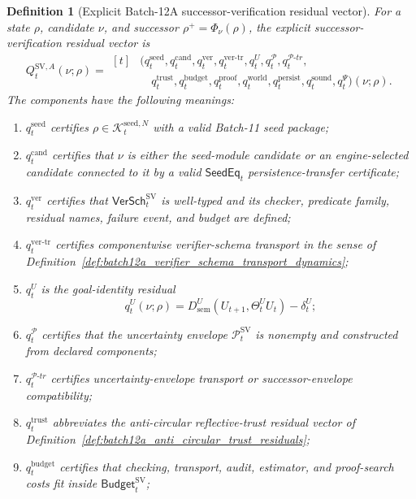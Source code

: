 \documentclass[11pt]{article}
\newtheorem{definition}[theorem]{Definition}
\newcommand{\Pcal}{\mathcal{P}}
\newcommand{\1}{\mathbf{1}}
\providecommand{\Kcal}{\mathcal{K}}
\providecommand{\sem}{\mathrm{sem}}
\begin{document}
\begin{definition}[Explicit Batch-12A successor-verification residual vector]
\label{def:batch12a_explicit_sv_residual_vector}
For a state \(\rho\), candidate \(\nu\), and successor \(\rho^+=\Phi_\nu(\rho)\), the explicit successor-verification residual vector is
\[
Q_t^{\mathrm{SV},A}(\nu;\rho)
=
\begin{aligned}[t]
{}&\bigl(q_t^{\mathrm{seed}},q_t^{\mathrm{cand}},q_t^{\mathrm{ver}},q_t^{\mathrm{ver\mbox{-}tr}},q_t^{U},q_t^{\Pcal},q_t^{\Pcal\mbox{-}tr},\\
&\quad q_t^{\mathrm{trust}},q_t^{\mathrm{budget}},q_t^{\mathrm{proof}},q_t^{\mathrm{world}},q_t^{\mathrm{persist}},q_t^{\mathrm{sound}},q_t^{\Psi}\bigr)(\nu;\rho).
\end{aligned}
\]
The components have the following meanings:
\begin{enumerate}[label=(\roman*),leftmargin=1.5em]
    \item \(q_t^{\mathrm{seed}}\) certifies \(\rho\in\Kcal_t^{\mathrm{seed},N}\) with a valid Batch-11 seed package;
    \item \(q_t^{\mathrm{cand}}\) certifies that \(\nu\) is either the seed-module candidate or an engine-selected candidate connected to it by a valid \(\mathsf{SeedEq}_t\) persistence-transfer certificate;
    \item \(q_t^{\mathrm{ver}}\) certifies that \(\mathsf{VerSch}_t^{\mathrm{SV}}\) is well-typed and its checker, predicate family, residual names, failure event, and budget are defined;
    \item \(q_t^{\mathrm{ver\mbox{-}tr}}\) certifies componentwise verifier-schema transport in the sense of Definition~\ref{def:batch12a_verifier_schema_transport_dynamics};
    \item \(q_t^U\) is the goal-identity residual
    \[
    q_t^U(\nu;\rho)=D_{\sem}^U(U_{t+1},\Theta_t^U U_t)-\delta_t^U;
    \]
    \item \(q_t^{\Pcal}\) certifies that the uncertainty envelope \(\Pcal_t^{\mathrm{SV}}\) is nonempty and constructed from declared components;
    \item \(q_t^{\Pcal\mbox{-}tr}\) certifies uncertainty-envelope transport or successor-envelope compatibility;
    \item \(q_t^{\mathrm{trust}}\) abbreviates the anti-circular reflective-trust residual vector of Definition~\ref{def:batch12a_anti_circular_trust_residuals};
    \item \(q_t^{\mathrm{budget}}\) certifies that checking, transport, audit, estimator, and proof-search costs fit inside \(\mathsf{Budget}_t^{\mathrm{SV}}\);

\end{enumerate}
\end{definition}
\end{document}

